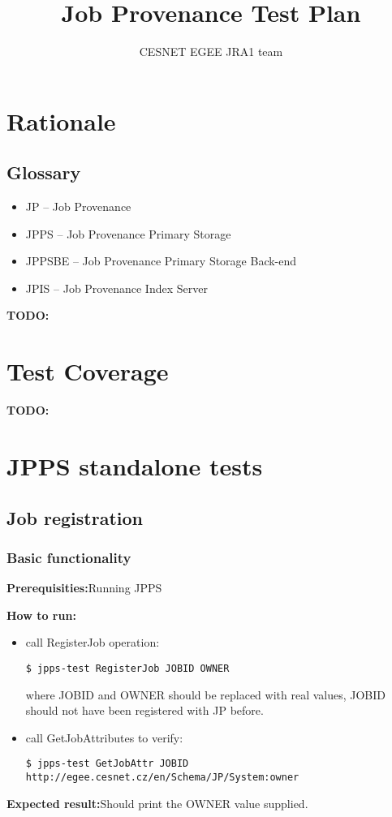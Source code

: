 \documentclass{egee}
\title{Job Provenance Test Plan}
\author{CESNET EGEE JRA1 team}
\def\req{\noindent\textbf{Prerequisities:}}
\def\how{\noindent\textbf{How to run:}}
\def\result{\noindent\textbf{Expected result:}}
\def\todo#1{\textbf{TODO:} #1}
\begin{document}

\newpage
\tableofcontents
\newpage

\section{Rationale}
\subsection{Glossary}
\begin{itemize}
\item JP -- Job Provenance
\item JPPS -- Job Provenance Primary Storage
\item JPPSBE -- Job Provenance Primary Storage Back-end
\item JPIS -- Job Provenance Index Server
\end{itemize}

\todo{}

\section{Test Coverage}
\todo{}


\section{JPPS standalone tests}

\subsection{Job registration}

\subsubsection{Basic functionality}
\label{regjob}
\req Running JPPS

\how
\begin{itemize}
\item call RegisterJob operation:
\begin{verbatim}
$ jpps-test RegisterJob JOBID OWNER
\end{verbatim}
where JOBID and OWNER should be replaced with real values, JOBID should not have
been registered with JP before.

\item  call GetJobAttributes to verify:
\begin{verbatim}
$ jpps-test GetJobAttr JOBID http://egee.cesnet.cz/en/Schema/JP/System:owner
\end{verbatim}
\end{itemize}
\result Should print the OWNER value supplied.
\end{document}
